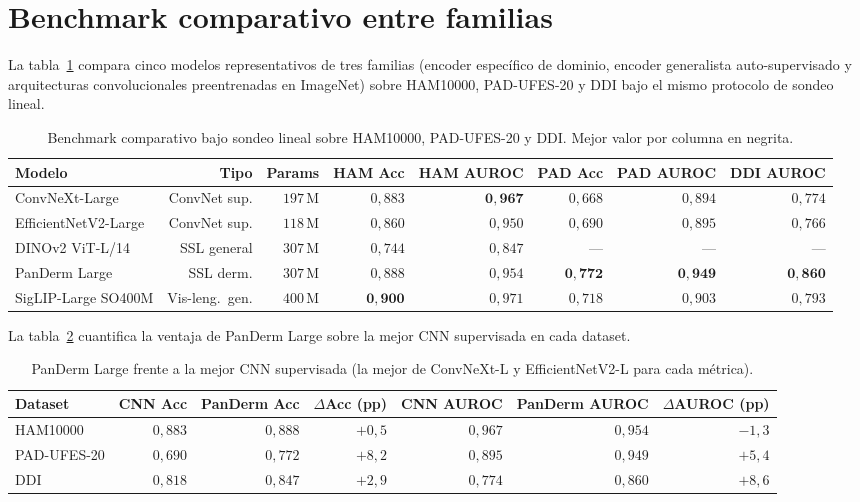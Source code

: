 \section{Benchmark comparativo entre familias}
\label{sec:benchmark}

La tabla~\ref{tab:benchmark} compara cinco modelos representativos
de tres familias (encoder específico de dominio, encoder generalista
auto-supervisado y arquitecturas convolucionales preentrenadas en
ImageNet) sobre HAM10000, PAD-UFES-20 y DDI bajo el mismo protocolo
de sondeo lineal.

\begin{table}[H]
\centering
\footnotesize
\setlength{\tabcolsep}{4pt}
\renewcommand{\arraystretch}{0.95}
\caption{Benchmark comparativo bajo sondeo lineal sobre HAM10000,
PAD-UFES-20 y DDI. Mejor valor por columna en negrita.}
\label{tab:benchmark}
\begin{tabular}{lrrrrrrr}
\hline
Modelo                  & Tipo          & Params & HAM Acc       & HAM AUROC     & PAD Acc       & PAD AUROC     & DDI AUROC \\
\hline
ConvNeXt-Large          & ConvNet sup.  & $197$\,M & $0{,}883$ & $\mathbf{0{,}967}$ & $0{,}668$ & $0{,}894$ & $0{,}774$ \\
EfficientNetV2-Large    & ConvNet sup.  & $118$\,M & $0{,}860$ & $0{,}950$ & $0{,}690$ & $0{,}895$ & $0{,}766$ \\
DINOv2 ViT-L/14         & SSL general   & $307$\,M & $0{,}744$ & $0{,}847$ & ---       & ---       & --- \\
PanDerm Large           & SSL derm.     & $307$\,M & $0{,}888$ & $0{,}954$ & $\mathbf{0{,}772}$ & $\mathbf{0{,}949}$ & $\mathbf{0{,}860}$ \\
SigLIP-Large SO400M     & Vis-leng.\ gen.& $400$\,M & $\mathbf{0{,}900}$ & $0{,}971$ & $0{,}718$ & $0{,}903$ & $0{,}793$ \\
\hline
\end{tabular}
\end{table}

La tabla~\ref{tab:gap-cnn} cuantifica la ventaja de PanDerm Large
sobre la mejor CNN supervisada en cada dataset.

\begin{table}[H]
\centering
\footnotesize
\setlength{\tabcolsep}{4pt}
\caption{PanDerm Large frente a la mejor CNN supervisada (la mejor de
ConvNeXt-L y EfficientNetV2-L para cada métrica).}
\label{tab:gap-cnn}
\begin{tabular}{lrrrrrr}
\hline
Dataset     & CNN Acc       & PanDerm Acc   & $\Delta$Acc (pp) & CNN AUROC     & PanDerm AUROC & $\Delta$AUROC (pp) \\
\hline
HAM10000    & $0{,}883$     & $0{,}888$     & $+0{,}5$         & $0{,}967$     & $0{,}954$     & $-1{,}3$ \\
PAD-UFES-20 & $0{,}690$     & $0{,}772$     & $+8{,}2$         & $0{,}895$     & $0{,}949$     & $+5{,}4$ \\
DDI         & $0{,}818$     & $0{,}847$     & $+2{,}9$         & $0{,}774$     & $0{,}860$     & $+8{,}6$ \\
\hline
\end{tabular}
\end{table}

